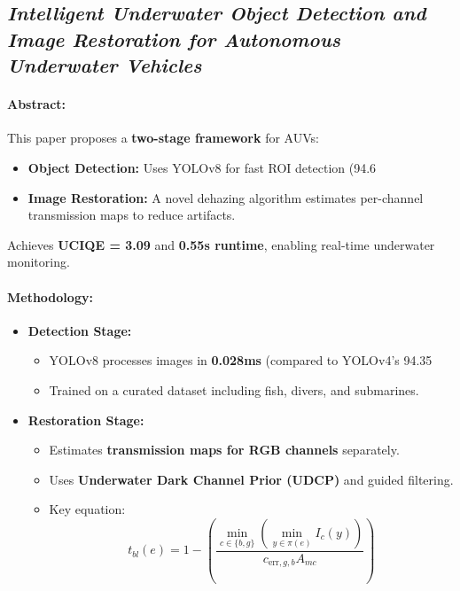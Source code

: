 \subsection{\textit{Intelligent Underwater Object Detection and Image Restoration for Autonomous Underwater Vehicles}\cite{Fayaz_2023}}

\paragraph{Abstract:}
This paper proposes a \textbf{two-stage framework} for AUVs:
\begin{itemize}
    \item \textbf{Object Detection:} Uses YOLOv8 for fast ROI detection (94.6%
    \item \textbf{Image Restoration:} A novel dehazing algorithm estimates per-channel transmission maps to reduce artifacts.
\end{itemize}
Achieves \textbf{UCIQE = 3.09} and \textbf{0.55s runtime}, enabling real-time underwater monitoring.

\paragraph{Methodology:}
\begin{itemize}
    \item \textbf{Detection Stage:}
          \begin{itemize}
              \item YOLOv8 processes images in \textbf{0.028ms} (compared to YOLOv4’s 94.35%
              \item Trained on a curated dataset including fish, divers, and submarines.
          \end{itemize}

    \item \textbf{Restoration Stage:}
          \begin{itemize}
              \item Estimates \textbf{transmission maps for RGB channels} separately.
              \item Uses \textbf{Underwater Dark Channel Prior (UDCP)} and guided filtering.
              \item Key equation:
                    \[
                        t_{bl}(e) = 1 - \left( \frac{\min_{c \in \{b,g\}}(\min_{y \in \pi(e)} I_c(y))}{c_{\text{err},g,b} A_{mc}} \right)
                    \]
          \end{itemize}
\end{itemize}

